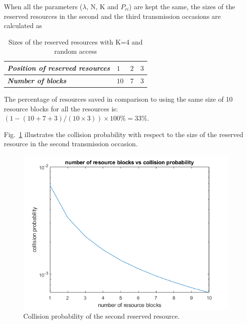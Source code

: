\documentclass[conference]{IEEEtran}
\begin{document}
When all the parameters ($\lambda$, N, K and $P_{ci}$) are kept the same, the sizes of the reserved resources in the second and the third transmission occasions are calculated as
\begin{table}[htbp]
\caption{Sizes of the reserved resources with K=4 and random access}
\begin{center}
\begin{tabular}{|p{10em}|p{2em}|p{2em}|p{2em}|}
 \hline
 \textbf{\textit{Position of reserved resources}} & $1$ &$2$ &$3$ \\ 
 \hline
 \textbf{\textit{Number of blocks}} & $10$ &$7$ &$3$ \\

 
 \hline
\end{tabular}
\label{tab1}
\end{center}
\end{table}


The percentage of resources saved in comparison to using the same size of 10 resource blocks for all the resources is: $(1 - (10+7+3)/(10\times3))\times100\% = 33\%$.

Fig.~\ref{fig8} illustrates the collision probability with respect to the size of the reserved resource in the second transmission occasion.

\begin{figure}[htbp]
\centerline{\includegraphics[scale=0.32]{fig8.png}}
\caption{Collision probability of the second reserved resource.}
\label{fig8}
\end{figure}
\end{document}
